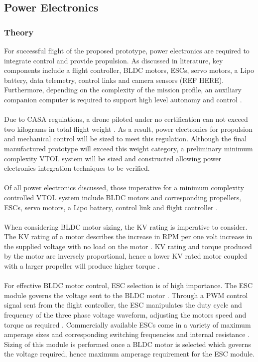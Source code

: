 \subsection{Power Electronics}

\subsubsection{Theory}
For successful flight of the proposed prototype, power electronics are required to integrate control and provide propulsion. As discussed in literature, key components include a flight controller, BLDC motors, ESCs, servo motors, a Lipo battery, data telemetry, control links and camera sensors (REF HERE). Furthermore, depending on the complexity of the mission profile, an auxiliary companion computer is required to support high level autonomy and control \cite{deci1995human}.\\
\\
Due to CASA regulations, a drone piloted under no certification can not exceed two kilograms in total flight weight \cite{CASA}. As a result, power electronics for propulsion and mechanical control will be sized to meet this regulation. Although the final manufactured prototype will exceed this weight category, a preliminary minimum complexity VTOL system will be sized and constructed allowing power electronics integration techniques to be verified.\\
\\
Of all power electronics discussed, those imperative for a minimum complexity controlled VTOL system include BLDC motors and corresponding propellers, ESCs, servo motors, a Lipo battery, control link and flight controller \cite{vervoorst2016modular}.\\
\\
When considering BLDC motor sizing, the KV rating is imperative to consider. The KV rating of a motor describes the increase in RPM per one volt increase in the supplied voltage with no load on the motor \cite{shaikh2017design}. KV rating and torque produced by the motor are inversely proportional, hence a lower KV rated motor coupled with a larger propeller will produce higher torque \cite{shaikh2017design}.\\
\\
For effective BLDC motor control, ESC selection is of high importance. The ESC module governs the voltage sent to the BLDC motor \cite{green2015modeling}. Through a PWM control signal sent from the flight controller, the ESC manipulates the duty cycle and frequency of the three phase voltage waveform, adjusting the motors speed and torque as required \cite{green2015modeling}. Commercially available ESCs come in a variety of maximum amperage sizes and corresponding switching frequencies and internal resistance \cite{green2015modeling}. Sizing of this module is performed once a BLDC motor is selected which governs the voltage required, hence maximum amperage requirement for the ESC module.\\
